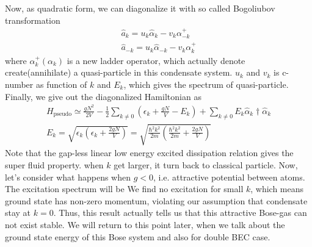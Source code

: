 Now, as quadratic form, we can diagonalize it with so called Bogoliubov transformation
\begin{equation}
\begin{split}
\hat{a}_k=u_k\hat{\alpha }_k-v_k\alpha _{-k}^+\\
\hat{a}_{-k}=u_k\hat{\alpha }_{-k}-v_k\alpha _k^+
\end{split}
\end{equation}
where $\alpha _k^+\left(\alpha _k\right)$ is a new ladder operator, which actually denote create(annihilate) a quasi-particle in this condensate system. $u_k$ and $v_k$ is c-number as function of $k$ and $E_k$, which gives the spectrum of quasi-particle. 
Finally, we give out the diagonalized Hamiltonian as
\begin{equation}
\begin{split}
H_{\text{pseudo}}\simeq \frac{g N^2}{2V}-\frac{1}{2}\sum _{k\neq 0} \left(\epsilon _k+\frac{g N}{V}-E_k\right)+\sum _{k\neq 0} E_k\hat{\alpha }_k\dagger\hat{\alpha
}_k\\
E_k=\sqrt{\epsilon _k\left(\epsilon _k+\frac{2 g N}{V}\right)}=\sqrt{\frac{\hbar ^2k^2}{2m}\left(\frac{\hbar ^2k^2}{2m}+\frac{2 g N}{V}\right)}
\end{split}
\end{equation}
Note that the gap-less linear low energy excited dissipation relation gives the super fluid property. when $k$ get larger, it turn back to classical particle.
Now, let's consider what happens when $g<0$, i.e. attractive potential between atoms. The excitation spectrum will be
We find no excitation for small $k$, which means ground state has non-zero momentum, violating our assumption that condensate stay at $k=0$.
Thus, this result actually tells us that this attractive Bose-gas can not exist stable. We will return to this point later, when we talk about the ground state energy of this Bose system and also for double BEC case.

